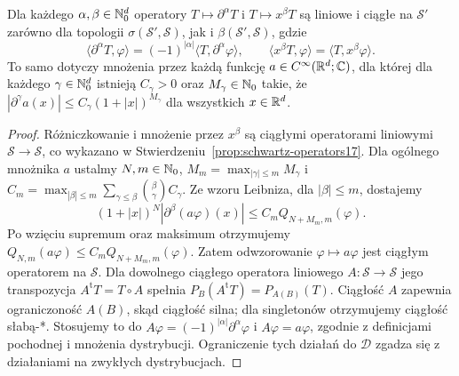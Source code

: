 \begin{twierdzenie}
\label{thm:tempered-operators22}
Dla każdego $\alpha,\beta\in\mathbb N_0^d$ operatory
$T\mapsto\partial^\alpha T$ i $T\mapsto x^\beta T$
są liniowe i ciągłe na $\mathcal S'$ zarówno dla topologii
$\sigma(\mathcal S',\mathcal S)$, jak i
$\beta(\mathcal S',\mathcal S)$, gdzie
\[
\langle\partial^\alpha T,\varphi\rangle
=(-1)^{|\alpha|}\langle T,\partial^\alpha\varphi\rangle,
\qquad\langle x^\beta T,\varphi\rangle
=\langle T,x^\beta\varphi\rangle.
\]
To samo dotyczy mnożenia przez każdą funkcję
$a\in C^\infty(\mathbb R^d;\mathbb C)$, dla której dla każdego
$\gamma\in\mathbb N_0^d$ istnieją $C_\gamma>0$ oraz
$M_\gamma\in\mathbb N_0$ takie, że
$|\partial^\gamma a(x)|\le C_\gamma(1+|x|)^{M_\gamma}$
dla wszystkich $x\in\mathbb R^d$.
\end{twierdzenie}
\begin{proof}
Różniczkowanie i mnożenie przez $x^\beta$ są ciągłymi
operatorami liniowymi $\mathcal S\to\mathcal S$,
co wykazano w Stwierdzeniu~\ref{prop:schwartz-operators17}.
Dla ogólnego mnożnika $a$ ustalmy $N,m\in\mathbb N_0$,
$M_m=\max_{|\gamma|\le m}M_\gamma$ i
$C_m=\max_{|\beta|\le m}\sum_{\gamma\le\beta}
\binom\beta\gamma C_\gamma$.
Ze wzoru Leibniza, dla $|\beta|\le m$, dostajemy
\[
 (1+|x|)^N|\partial^\beta(a\varphi)(x)|
 \le C_m Q_{N+M_m,m}(\varphi).
\]
Po wzięciu supremum oraz maksimum otrzymujemy
$Q_{N,m}(a\varphi)\le C_m Q_{N+M_m,m}(\varphi)$.
Zatem odwzorowanie $\varphi\mapsto a\varphi$ jest
ciągłym operatorem na $\mathcal S$.
Dla dowolnego ciągłego operatora liniowego
$A:\mathcal S\to\mathcal S$ jego transpozycja
$A^{\mathrm t}T=T\circ A$ spełnia
$P_B(A^{\mathrm t}T)=P_{A(B)}(T)$.
Ciągłość $A$ zapewnia ograniczoność $A(B)$, skąd
ciągłość silna; dla singletonów otrzymujemy ciągłość
słabą-*. Stosujemy to do $A\varphi=(-1)^{|\alpha|}
\partial^\alpha\varphi$ i $A\varphi=a\varphi$,
zgodnie z definicjami pochodnej i mnożenia dystrybucji.
Ograniczenie tych działań do $\mathcal D$ zgadza się
z działaniami na zwykłych dystrybucjach.
\end{proof}

